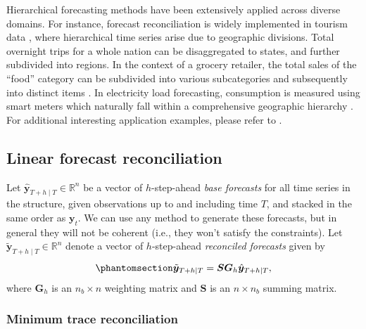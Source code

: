 \documentclass[
  11pt]{article}
\theoremstyle{plain}
\theoremstyle{remark}
\begin{document}
Hierarchical forecasting methods have been extensively applied across
diverse domains. For instance, forecast reconciliation is widely
implemented in tourism data \citep{Athanasopoulos2009-ps}, where
hierarchical time series arise due to geographic divisions. Total
overnight trips for a whole nation can be disaggregated to states, and
further subdivided into regions. In the context of a grocery retailer,
the total sales of the ``food'' category can be subdivided into various
subcategories and subsequently into distinct items
\citep{Zhang2023-op, Hollyman2021-un}. In electricity load forecasting,
consumption is measured using smart meters which naturally fall within a
comprehensive geographic hierarchy \citep{Taieb2021-tc}. For additional
interesting application examples, please refer to
\citet{Athanasopoulos2023-sm}.

\subsection{Linear forecast
reconciliation}\label{linear-forecast-reconciliation}

Let \(\hat{\bm{y}}_{T+h \mid T} \in \mathbb{R}^n\) be a vector of
\(h\)-step-ahead \emph{base forecasts} for all time series in the
structure, given observations up to and including time \(T\), and
stacked in the same order as \(\bm{y}_t\). We can use any method to
generate these forecasts, but in general they will not be coherent
(i.e., they won't satisfy the constraints). Let
\(\tilde{\bm{y}}_{T+h \mid T} \in \mathbb{R}^n\) denote a vector of
\(h\)-step-ahead \emph{reconciled forecasts} given by
\begin{equation}\phantomsection\label{eq-lr}{
\tilde{\bm{y}}_{T+h \mid T} = \bm{S}\bm{G}_h\hat{\bm{y}}_{T+h \mid T},
}\end{equation} where \(\bm{G}_h\) is an \(n_b \times n\) weighting
matrix and \(\bm{S}\) is an \(n \times n_b\) summing matrix.

\subsubsection*{Minimum trace
reconciliation}\label{minimum-trace-reconciliation}
\end{document}
